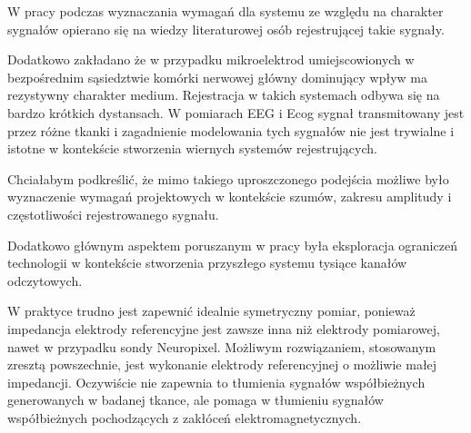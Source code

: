 \begin{frame}[t]
W pracy podczas wyznaczania wymagań dla systemu ze względu na charakter sygnałów opierano się na wiedzy literaturowej osób rejestrującej takie sygnały.

Dodatkowo zakładano że w przypadku mikroelektrod umiejscowionych w bezpośrednim sąsiedztwie komórki nerwowej główny dominujący wpływ ma rezystywny charakter medium. Rejestracja w takich systemach odbywa się na bardzo krótkich dystansach.
W pomiarach EEG i Ecog sygnał transmitowany jest przez różne tkanki i zagadnienie modelowania tych sygnałów nie jest trywialne i istotne w kontekście stworzenia wiernych systemów rejestrujących.

Chciałabym podkreślić, że mimo takiego uproszczonego podejścia możliwe było wyznaczenie wymagań projektowych w kontekście szumów, zakresu amplitudy i częstotliwości rejestrowanego sygnału.

Dodatkowo głównym aspektem poruszanym w pracy była eksploracja ograniczeń technologii w kontekście stworzenia przyszłego systemu tysiące kanałów odczytowych.




\end{frame}
\begin{frame}[t]
    \begin{block}{\tb}
    \end{block}
    
    W praktyce trudno jest zapewnić idealnie symetryczny pomiar, ponieważ impedancja elektrody referencyjne jest zawsze inna niż elektrody pomiarowej, nawet w przypadku sondy Neuropixel. Możliwym rozwiązaniem, stosowanym zresztą powszechnie, jest wykonanie elektrody referencyjnej o możliwie małej impedancji. Oczywiście nie zapewnia to tłumienia sygnałów współbieżnych generowanych w badanej tkance, ale pomaga w tłumieniu sygnałów współbieżnych pochodzących z zakłóceń elektromagnetycznych. 
\end{frame}



